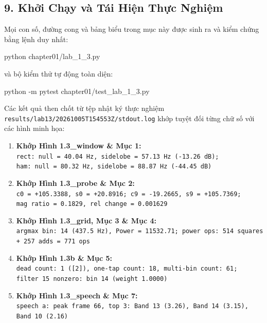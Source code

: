 \documentclass[11pt,a4paper]{article}
\begin{document}
\subsection*{9. Khởi Chạy và Tái Hiện Thực Nghiệm}

Mọi con số, đường cong và bảng biểu trong mục này được sinh ra và kiểm chứng bằng lệnh duy nhất:
\begin{center}
\ttfamily\small
python chapter01/lab\_1\_3.py
\end{center}
và bộ kiểm thử tự động toàn diện:
\begin{center}
\ttfamily\small
python -m pytest chapter01/test\_lab\_1\_3.py
\end{center}

Các kết quả then chốt từ tệp nhật ký thực nghiệm \nolinkurl{results/lab13/20261005T154553Z/stdout.log} khớp tuyệt đối từng chữ số với các hình minh họa:
\begin{enumerate}
    \setlength{\itemsep}{1.5pt}
    \item \textbf{Khớp Hình 1.3\_window \& Mục 1:}\\
    \footnotesize\texttt{rect: null = 40.04 Hz, sidelobe = 57.13 Hz (-13.26 dB);}\\
    \footnotesize\texttt{ham: null = 80.32 Hz, sidelobe = 88.87 Hz (-44.45 dB)}
    \item \textbf{Khớp Hình 1.3\_probe \& Mục 2:}\\
    \footnotesize\texttt{c0 = +105.3388, s0 = +20.8916; c9 = -19.2665, s9 = +105.7369;}\\
    \footnotesize\texttt{mag ratio = 0.1829, rel change = 0.001629}
    \item \textbf{Khớp Hình 1.3\_grid, Mục 3 \& Mục 4:}\\
    \footnotesize\texttt{argmax bin: 14 (437.5 Hz), Power = 11532.71; power ops: 514 squares + 257 adds = 771 ops}
    \item \textbf{Khớp Hình 1.3b \& Mục 5:}\\
    \footnotesize\texttt{dead count: 1 ([2]), one-tap count: 18, multi-bin count: 61;}\\
    \footnotesize\texttt{filter 15 nonzero: bin 14 (weight 1.0000)}
    \item \textbf{Khớp Hình 1.3\_speech \& Mục 7:}\\
    \footnotesize\texttt{speech a: peak frame 66, top 3: Band 13 (3.26), Band 14 (3.15), Band 10 (2.16)}
\end{enumerate}
\end{document}
